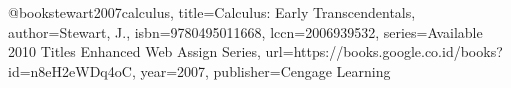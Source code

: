 @book{stewart2007calculus,
  title={Calculus: Early Transcendentals},
  author={Stewart, J.},
  isbn={9780495011668},
  lccn={2006939532},
  series={Available 2010 Titles Enhanced Web Assign Series},
  url={https://books.google.co.id/books?id=n8eH2eWDq4oC},
  year={2007},
  publisher={Cengage Learning}
}
